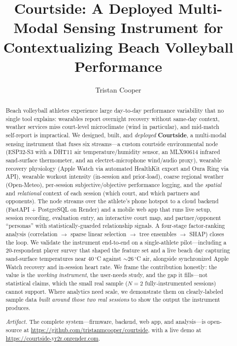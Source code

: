 \documentclass[sigconf,nonacm]{acmart}
\title{Courtside: A Deployed Multi-Modal Sensing Instrument for Contextualizing Beach Volleyball Performance}
\author{Tristan Cooper}
\affiliation{%
  \institution{UC San Diego}
  \city{La Jolla}
  \state{CA}
  \country{USA}
}
\begin{document}
\begin{abstract}
Beach volleyball athletes experience large day-to-day performance variability that no single tool explains: wearables report overnight recovery without same-day context, weather services miss court-level microclimate (wind in particular), and mid-match self-report is impractical. We designed, built, and \emph{deployed} \textbf{Courtside}, a multi-modal sensing instrument that fuses six streams---a custom courtside environmental node (ESP32-S3 with a DHT11 air temperature/humidity sensor, an MLX90614 infrared sand-surface thermometer, and an electret-microphone wind/audio proxy), wearable recovery physiology (Apple Watch via automated HealthKit export and Oura Ring via API), wearable workout intensity (in-session and prior-load), coarse regional weather (Open-Meteo), per-session subjective/objective performance logging, and the \emph{spatial} and \emph{relational} context of each session (which court, and which partners and opponents). The node streams over the athlete's phone hotspot to a cloud backend (FastAPI + PostgreSQL on Render) and a mobile web app that runs live setup, session recording, evaluation entry, an interactive court map, and partner/opponent ``personas'' with statistically-guarded relationship signals. A four-stage factor-ranking analysis (correlation $\rightarrow$ sparse linear selection $\rightarrow$ tree ensembles $\rightarrow$ SHAP) closes the loop. We validate the instrument end-to-end on a single-athlete pilot---including a 20-respondent player survey that shaped the feature set and a live beach day capturing sand-surface temperatures near 40\,$^\circ$C against $\sim$26\,$^\circ$C air, alongside synchronized Apple Watch recovery and in-session heart rate. We frame the contribution honestly: the value is the \emph{working instrument}, the user-needs study, and the gap it fills---not statistical claims, which the small real sample ($N{=}2$ fully-instrumented sessions) cannot support. Where analytics need scale, we demonstrate them on clearly-labeled sample data \emph{built around those two real sessions} to show the output the instrument produces.

\smallskip
\noindent\emph{Artifact.} The complete system---firmware, backend, web app, and analysis---is open-source at \url{https://github.com/tristanmcooper/courtside}, with a live demo at \url{https://courtside-yr2r.onrender.com}.
\end{abstract}

\maketitle
\end{document}
